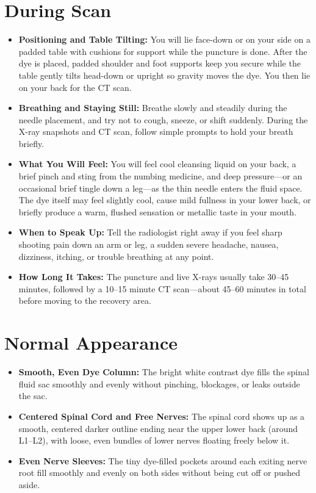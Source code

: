 \section{During Scan}
\begin{itemize}
    \item \textbf{Positioning and Table Tilting:} You will lie face-down or on your side on a padded table with cushions for support while the puncture is done. After the dye is placed, padded shoulder and foot supports keep you secure while the table gently tilts head-down or upright so gravity moves the dye. You then lie on your back for the CT scan.
    \item \textbf{Breathing and Staying Still:} Breathe slowly and steadily during the needle placement, and try not to cough, sneeze, or shift suddenly. During the X-ray snapshots and CT scan, follow simple prompts to hold your breath briefly.
    \item \textbf{What You Will Feel:} You will feel cool cleansing liquid on your back, a brief pinch and sting from the numbing medicine, and deep pressure---or an occasional brief tingle down a leg---as the thin needle enters the fluid space. The dye itself may feel slightly cool, cause mild fullness in your lower back, or briefly produce a warm, flushed sensation or metallic taste in your mouth.
    \item \textbf{When to Speak Up:} Tell the radiologist right away if you feel sharp shooting pain down an arm or leg, a sudden severe headache, nausea, dizziness, itching, or trouble breathing at any point.
    \item \textbf{How Long It Takes:} The puncture and live X-rays usually take 30--45 minutes, followed by a 10--15 minute CT scan---about 45--60 minutes in total before moving to the recovery area.
\end{itemize}

\section{Normal Appearance}
\begin{itemize}
    \item \textbf{Smooth, Even Dye Column:} The bright white contrast dye fills the spinal fluid sac smoothly and evenly without pinching, blockages, or leaks outside the sac.
    \item \textbf{Centered Spinal Cord and Free Nerves:} The spinal cord shows up as a smooth, centered darker outline ending near the upper lower back (around L1--L2), with loose, even bundles of lower nerves floating freely below it.
    \item \textbf{Even Nerve Sleeves:} The tiny dye-filled pockets around each exiting nerve root fill smoothly and evenly on both sides without being cut off or pushed aside.
\end{itemize}

